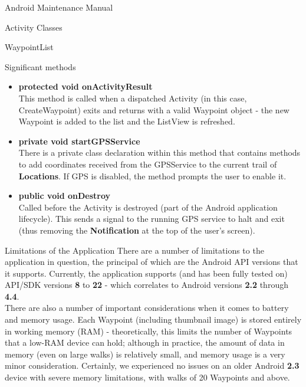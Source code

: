 \documentclass{article}
\begin{document}
\begin{section}{Android Maintenance Manual}
\begin{subsection}{Activity Classes}
\begin{subsubsection}{WaypointList}
			
			\begin{paragraph}{Significant methods}
				\begin{itemize}
					\item{{\bf protected void onActivityResult} \\
					This method is called when a dispatched Activity (in this case, CreateWaypoint) exits and returns with a valid Waypoint object - the new Waypoint is added to the list and the ListView is refreshed.}
					
					\item{{\bf private void startGPSService} \\
					There is a private class declaration within this method that contains methods to add coordinates received from the GPSService to the current trail of {\bf Locations}. If GPS is disabled, the method prompts the user to enable it.}
					
					\item{{\bf public void onDestroy} \\
					Called before the Activity is destroyed (part of the Android application lifecycle). This sends a signal to the running GPS service to halt and exit (thus removing the {\bf Notification} at the top of the user's screen).}
				\end{itemize}
			\end{paragraph}
		\end{subsubsection}
	\end{subsection}
	
	\begin{subsection}{Limitations of the Application}
		There are a number of limitations to the application in question, the principal of which are the Android API versions that it supports. Currently, the application supports (and has been fully tested on) API/SDK versions {\bf 8} to {\bf 22} - which correlates to Android versions {\bf 2.2} through {\bf 4.4}. \\
		
		There are also a number of important considerations when it comes to battery and memory usage. Each Waypoint (including thumbnail image) is stored entirely in working memory (RAM) - theoretically, this limits the number of Waypoints that a low-RAM device can hold; although in practice, the amount of data in memory (even on large walks) is relatively small, and memory usage is a very minor consideration. Certainly, we experienced no issues on an older Android {\bf 2.3} device with severe memory limitations, with walks of 20 Waypoints and above. \\
		

\end{subsection}
\end{section}
\end{document}
